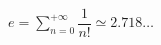 \documentclass[preview]{standalone}
\begin{document}
\begin{align*}
e = \sum_{n = 0}^{+\infty}\dfrac{1}{n!}\simeq 2.718\dots
\end{align*}
\end{document}

